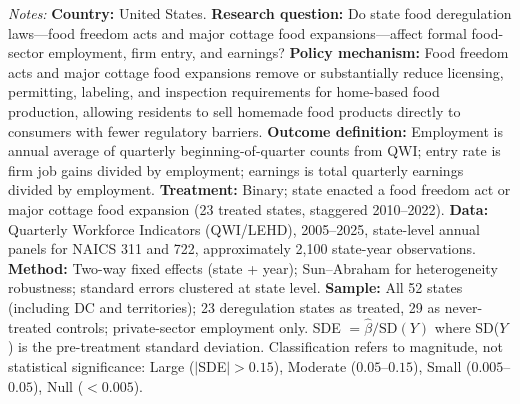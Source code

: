 \begin{table}[t]
\vspace{0.5em}
\begin{minipage}{0.95\textwidth}
\footnotesize
\textit{Notes:} \textbf{Country:} United States. \textbf{Research question:} Do state food deregulation laws---food freedom acts and major cottage food expansions---affect formal food-sector employment, firm entry, and earnings? \textbf{Policy mechanism:} Food freedom acts and major cottage food expansions remove or substantially reduce licensing, permitting, labeling, and inspection requirements for home-based food production, allowing residents to sell homemade food products directly to consumers with fewer regulatory barriers. \textbf{Outcome definition:} Employment is annual average of quarterly beginning-of-quarter counts from QWI; entry rate is firm job gains divided by employment; earnings is total quarterly earnings divided by employment. \textbf{Treatment:} Binary; state enacted a food freedom act or major cottage food expansion (23 treated states, staggered 2010--2022). \textbf{Data:} Quarterly Workforce Indicators (QWI/LEHD), 2005--2025, state-level annual panels for NAICS 311 and 722, approximately 2,100 state-year observations. \textbf{Method:} Two-way fixed effects (state + year); Sun--Abraham for heterogeneity robustness; standard errors clustered at state level. \textbf{Sample:} All 52 states (including DC and territories); 23 deregulation states as treated, 29 as never-treated controls; private-sector employment only. SDE $= \hat{\beta} / \text{SD}(Y)$ where SD($Y$) is the pre-treatment standard deviation. Classification refers to magnitude, not statistical significance: Large ($|$SDE$| > 0.15$), Moderate ($0.05$--$0.15$), Small ($0.005$--$0.05$), Null ($< 0.005$).
\end{minipage}
\end{table}

